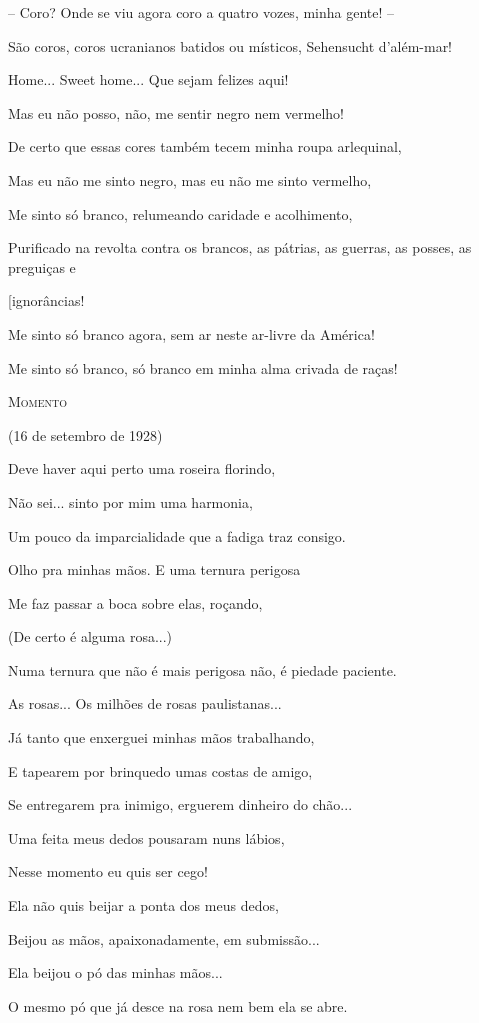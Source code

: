 -- Coro? Onde se viu agora coro a quatro vozes, minha gente! --

São coros, coros ucranianos batidos ou místicos, Sehensucht d'além-mar!

Home... Sweet home... Que sejam felizes aqui!

Mas eu não posso, não, me sentir negro nem vermelho!

De certo que essas cores também tecem minha roupa arlequinal,

Mas eu não me sinto negro, mas eu não me sinto vermelho,

Me sinto só branco, relumeando caridade e acolhimento,

Purificado na revolta contra os brancos, as pátrias, as guerras, as
posses, as preguiças e

{[}ignorâncias!

Me sinto só branco agora, sem ar neste ar-livre da América!

Me sinto só branco, só branco em minha alma crivada de raças!

\textsc{Momento}

(16 de setembro de 1928)

Deve haver aqui perto uma roseira florindo,

Não sei... sinto por mim uma harmonia,

Um pouco da imparcialidade que a fadiga traz consigo.

Olho pra minhas mãos. E uma ternura perigosa

Me faz passar a boca sobre elas, roçando,

(De certo é alguma rosa...)

Numa ternura que não é mais perigosa não, é piedade paciente.

As rosas... Os milhões de rosas paulistanas...

Já tanto que enxerguei minhas mãos trabalhando,

E tapearem por brinquedo umas costas de amigo,

Se entregarem pra inimigo, erguerem dinheiro do chão...

Uma feita meus dedos pousaram nuns lábios,

Nesse momento eu quis ser cego!

Ela não quis beijar a ponta dos meus dedos,

Beijou as mãos, apaixonadamente, em submissão...

Ela beijou o pó das minhas mãos...

O mesmo pó que já desce na rosa nem bem ela se abre.

